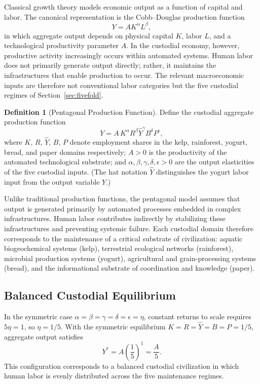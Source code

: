 \documentclass[12pt,a4paper]{article}
\theoremstyle{plain}
\theoremstyle{definition}
\newtheorem{definition}[theorem]{Definition}
\theoremstyle{remark}
\begin{document}
Classical growth theory models economic output as a function of capital and
labor.  The canonical representation is the Cobb--Douglas production function
\[
Y = A K^{\alpha} L^{\beta},
\]
in which aggregate output depends on physical capital $K$, labor $L$, and a
technological productivity parameter $A$.  In the custodial economy, however,
productive activity increasingly occurs within automated systems.  Human
labor does not primarily generate output directly; rather, it maintains the
infrastructures that enable production to occur.  The relevant macroeconomic
inputs are therefore not conventional labor categories but the five custodial
regimes of Section~\ref{sec:fivefold}.

\begin{definition}[Pentagonal Production Function]
Define the custodial aggregate production function
\[
Y = A\, K^{\alpha} R^{\beta} \hat{Y}^{\gamma} B^{\delta} P^{\epsilon},
\]
where $K$, $R$, $\hat{Y}$, $B$, $P$ denote employment shares in the kelp,
rainforest, yogurt, bread, and paper domains respectively; $A > 0$ is the
productivity of the automated technological substrate; and
$\alpha,\beta,\gamma,\delta,\epsilon > 0$ are the output elasticities of the
five custodial inputs.  (The hat notation $\hat{Y}$ distinguishes the yogurt
labor input from the output variable $Y$.)
\end{definition}

Unlike traditional production functions, the pentagonal model assumes that
output is generated primarily by automated processes embedded in complex
infrastructures.  Human labor contributes indirectly by stabilizing these
infrastructures and preventing systemic failure.  Each custodial domain
therefore corresponds to the maintenance of a critical substrate of
civilization: aquatic biogeochemical systems (kelp), terrestrial ecological
networks (rainforest), microbial production systems (yogurt), agricultural
and grain-processing systems (bread), and the informational substrate of
coordination and knowledge (paper).

\subsection{Balanced Custodial Equilibrium}

In the symmetric case $\alpha = \beta = \gamma = \delta = \epsilon = \eta$,
constant returns to scale requires $5\eta = 1$, so $\eta = 1/5$.  With
the symmetric equilibrium $K = R = \hat{Y} = B = P = 1/5$, aggregate output
satisfies
\[
Y^* = A \left(\frac{1}{5}\right)^{1} = \frac{A}{5}.
\]
This configuration corresponds to a balanced custodial civilization in which
human labor is evenly distributed across the five maintenance regimes.
\end{document}
